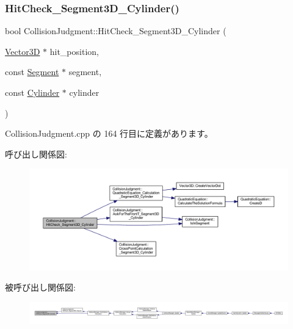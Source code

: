 \subsubsection{\texorpdfstring{Hit\+Check\+\_\+\+Segment3\+D\+\_\+\+Cylinder()}{HitCheck\_Segment3D\_Cylinder()}}
{\footnotesize\ttfamily bool Collision\+Judgment\+::\+Hit\+Check\+\_\+\+Segment3\+D\+\_\+\+Cylinder (\begin{DoxyParamCaption}\item[{\mbox{\hyperlink{class_vector3_d}{Vector3D}} $\ast$}]{hit\+\_\+position,  }\item[{const \mbox{\hyperlink{class_segment}{Segment}} $\ast$}]{segment,  }\item[{const \mbox{\hyperlink{class_cylinder}{Cylinder}} $\ast$}]{cylinder }\end{DoxyParamCaption})\hspace{0.3cm}{\ttfamily [static]}}



 Collision\+Judgment.\+cpp の 164 行目に定義があります。

呼び出し関係図\+:\nopagebreak
\begin{figure}[H]
\begin{center}
\leavevmode
\includegraphics[width=350pt]{class_collision_judgment_a61308e967a8569bcee4b25c74e28826d_cgraph}
\end{center}
\end{figure}
被呼び出し関係図\+:
\nopagebreak
\begin{figure}[H]
\begin{center}
\leavevmode
\includegraphics[width=350pt]{class_collision_judgment_a61308e967a8569bcee4b25c74e28826d_icgraph}
\end{center}
\end{figure}
\mbox{\label{class_collision_judgment_ac31167bc6d89d20f7220220ee3f21f4e}} 
